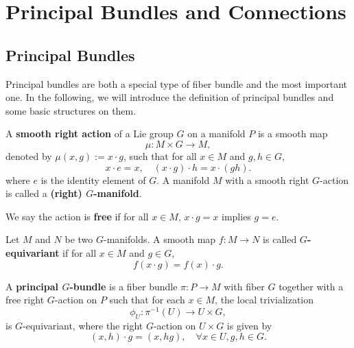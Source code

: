 \section{Principal Bundles and Connections}
\subsection{Principal Bundles}
Principal bundles are both a special type of fiber bundle and the most important one. 
In the following, we will introduce the definition of principal bundles and some basic structures on them. 
\begin{definition}[$G$-action]
    A \textbf{smooth right action} of a Lie group $G$ on a manifold $P$ is a smooth map 
    \begin{equation*}
        \mu: M\times G \to M, 
    \end{equation*}
    denoted by $\mu(x,g):=x\cdot g$, such that for all $x\in M$ and $g,h\in G$, 
    \begin{equation*}
        x\cdot e = x, \quad (x\cdot g)\cdot h = x\cdot (gh).
    \end{equation*}
    where $e$ is the identity element of $G$. 
    A manifold $M$ with a smooth right $G$-action is called a \textbf{{\rm(}right{\rm)} $G$-manifold}.

    We say the action is \textbf{free} if for all $x\in M$, $x\cdot g = x$ implies $g=e$.
\end{definition}
\begin{definition}
    Let $M$ and $N$ be two $G$-manifolds. 
    A smooth map $f: M\to N$ is called \textbf{$G$-equivariant} if for all $x\in M$ and $g\in G$, 
    \begin{equation*}
        f(x\cdot g) = f(x)\cdot g.
    \end{equation*}
\end{definition}
\begin{definition}
    A \textbf{principal $G$-bundle} is a fiber bundle $\pi: P\to M$ with fiber $G$ 
    together with a free right $G$-action on $P$ such that for each $x\in M$, 
    the local trivialization 
    \begin{equation*}
        \phi_U: \pi^{-1}(U)\to U\times G,
    \end{equation*}
    is $G$-equivariant, where the right $G$-action on $U\times G$ is given by 
    \begin{equation*}
        (x,h)\cdot g = (x,hg), \quad \forall x\in U, g,h\in G.
    \end{equation*}    
\end{definition}
